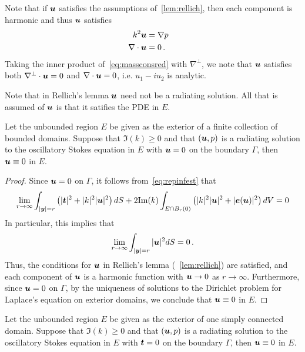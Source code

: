 \begin{remark} \label{rmk:harmu}
  Note that if ${\boldsymbol u}$ satisfies the assumptions
  of~\cref{lem:rellich}, then each component is harmonic
  and thus ${\boldsymbol u}$ satisfies
\begin{align}
k^2 {\boldsymbol u} &= \nabla p  \quad \label{eq:massconsred} \\
\nabla \cdot {\boldsymbol u} &= 0 \, . \nonumber
\end{align}
Taking the inner product of~\cref{eq:massconsred} with $\nabla^{\perp}$,
we note that ${\boldsymbol u}$ satisfies both $\nabla^{\perp} \cdot {\boldsymbol u} = 0$ 
and $\nabla \cdot {\boldsymbol u} = 0$, i.e. $u_1 - i u_2$ is analytic.
\end{remark}
\begin{remark}
Note that in Rellich's lemma ${\boldsymbol u}$ need not be a radiating solution. 
All that is assumed of ${\boldsymbol u}$ is that it satifies the PDE in $E$.
\end{remark}

\begin{thrm}
  Let the unbounded region $E$ be given as the exterior
  of a finite collection of bounded domains.
  Suppose that $\Im(k)\geq 0$ and 
  that $({\boldsymbol u},p)$ is a radiating solution to the oscillatory Stokes
  equation in $E$ with ${\boldsymbol u} =0$ on the boundary $\Gamma$, then
  ${\boldsymbol u} \equiv 0$ in $E$.
\end{thrm}

\begin{proof}
Since ${\boldsymbol u} = 0$ on $\Gamma$, it follows from~\cref{eq:repinfest} that
\begin{equation}
\lim_{r\to\infty}
\int_{|{\boldsymbol y}|=r} \left( |{\boldsymbol t}|^2 + |k|^2 |{\boldsymbol u}|^2 \right) dS +
2 {\textrm{\textup{Im}}}(k) \int_{E \cap B_{r}(0)} \left(|k|^2 |{\boldsymbol u}|^2 + |{\boldsymbol e}({\boldsymbol u})|^2 \right)
dV = 0 \nonumber
\end{equation} 
In particular, this implies that
\begin{equation}
\lim_{r\to\infty} \int_{|{\boldsymbol y}|=r} |{\boldsymbol u}|^2 dS = 0 \, . \nonumber
\end{equation}
Thus, the conditions for ${\boldsymbol u}$ in Rellich's lemma (~\cref{lem:rellich})
are satisfied, and each component of ${\boldsymbol u}$ is a harmonic function
with ${\boldsymbol u} \to 0$ as $r \to \infty$. Furthermore, since ${\boldsymbol u}=0$ on
$\Gamma$, by the uniqueness of solutions to the
Dirichlet problem for Laplace's equation
on exterior domains, we conclude that ${\boldsymbol u} \equiv 0$ in $E$.
\end{proof}

\begin{thrm}
  Let the unbounded region $E$ be given as the exterior
  of one simply connected domain.
  Suppose that $\Im(k)\geq 0$ and 
  that $({\boldsymbol u},p)$ is a radiating solution to the oscillatory Stokes
  equation in $E$ with ${\boldsymbol t} = 0$ on the boundary $\Gamma$, then
  ${\boldsymbol u} \equiv 0$ in $E$.
\end{thrm}

